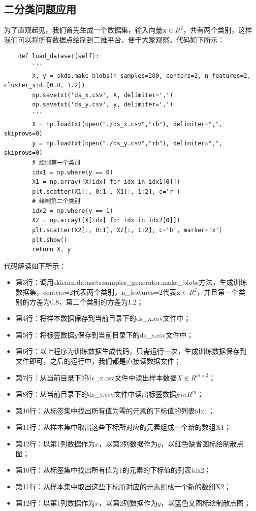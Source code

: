 \documentclass[UTF8]{article}
\begin{document}
\subsection{二分类问题应用}
为了直观起见，我们首先生成一个数据集，输入向量$\boldsymbol{x} \in R^{2}$，共有两个类别，这样我们可以将所有数据点绘制到二维平台，便于大家观察。代码如下所示：
\begin{lstlisting}
    def load_dataset(self):
        '''
        X, y = skds.make_blobs(n_samples=200, centers=2, n_features=2, cluster_std=[0.8, 1.2])
        np.savetxt('ds_x.csv', X, delimiter=',')
        np.savetxt('ds_y.csv', y, delimiter=',')
        '''
        X = np.loadtxt(open("./ds_x.csv","rb"), delimiter=",", skiprows=0)
        y = np.loadtxt(open("./ds_y.csv","rb"), delimiter=",", skiprows=0)
        # 绘制第一个类别
        idx1 = np.where(y == 0)
        X1 = np.array([X[idx] for idx in idx1[0]])
        plt.scatter(X1[:, 0:1], X1[:, 1:2], c='r')
        # 绘制第二个类别
        idx2 = np.where(y == 1)
        X2 = np.array([X[idx] for idx in idx2[0]])
        plt.scatter(X2[:, 0:1], X2[:, 1:2], c='b', marker='x')
        plt.show()
        return X, y
\end{lstlisting}
代码解读如下所示：
\begin{itemize}
\item 第3行：调用sklearn.datasets.samples\_generator.make\_blobs方法，生成训练数据集，centers=2代表两个类别，n\_features=2代表$\boldsymbol{x} \in R^{2}$，并且第一个类别的方差为0.8，第二个类别的方差为1.2；
\item 第4行：将样本数据保存到当前目录下的ds\_x.csv文件中；
\item 第5行：将标签数据$y$保存到当前目录下的ds\_y.csv文件中；
\item 第6行：以上程序为训练数据生成代码，只需运行一次，生成训练数据保存到文件即可，之后的运行中，我们都是直接读数据文件；
\item 第7行：从当前目录下的ds\_x.csv文件中读出样本数据$X \in R^{m \times 2}$；
\item 第8行：从当前目录下的ds\_y.csv文件中读出标签数据$\boldsymbol{y} in R^{m}$；
\item 第10行：从标签集中找出所有值为零的元素的下标值的列表idx1；
\item 第11行：从样本集中取出这些下标所对应的元素组成一个新的数组X1；
\item 第12行：以第1列数据作为$x$，以第2列数据作为$y$，以红色缺省图标绘制散点图；
\item 第10行：从标签集中找出所有值为1的元素的下标值的列表idx2；
\item 第11行：从样本集中取出这些下标所对应的元素组成一个新的数组X2；
\item 第12行：以第1列数据作为$x$，以第2列数据作为$y$，以蓝色叉图标绘制散点图；
\end{itemize}
\end{document}
